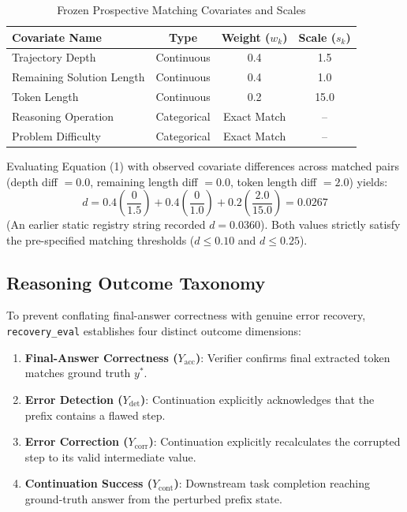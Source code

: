\documentclass[conference]{IEEEtran}
\begin{document}
\begin{table}[htbp]
\caption{Frozen Prospective Matching Covariates and Scales}
\label{tab:covariates}
\centering
\begin{tabularx}{\columnwidth}{Xccc}
\toprule
\textbf{Covariate Name} & \textbf{Type} & \textbf{Weight ($w_k$)} & \textbf{Scale ($s_k$)} \\
\midrule
Trajectory Depth & Continuous & 0.4 & 1.5 \\
Remaining Solution Length & Continuous & 0.4 & 1.0 \\
Token Length & Continuous & 0.2 & 15.0 \\
Reasoning Operation & Categorical & Exact Match & -- \\
Problem Difficulty & Categorical & Exact Match & -- \\
\bottomrule
\end{tabularx}
\end{table}

Evaluating Equation (1) with observed covariate differences across matched pairs (depth diff $= 0.0$, remaining length diff $= 0.0$, token length diff $= 2.0$) yields:
\begin{equation}
d = 0.4\left(\frac{0}{1.5}\right) + 0.4\left(\frac{0}{1.0}\right) + 0.2\left(\frac{2.0}{15.0}\right) = 0.0267
\end{equation}
(An earlier static registry string recorded $d=0.0360$). Both values strictly satisfy the pre-specified matching thresholds ($d \le 0.10$ and $d \le 0.25$).

\subsection{Reasoning Outcome Taxonomy}
To prevent conflating final-answer correctness with genuine error recovery, \texttt{recovery\_eval} establishes four distinct outcome dimensions:
\begin{enumerate}
    \item \textbf{Final-Answer Correctness ($Y_{\text{acc}}$)}: Verifier confirms final extracted token matches ground truth $y^*$.
    \item \textbf{Error Detection ($Y_{\text{det}}$)}: Continuation explicitly acknowledges that the prefix contains a flawed step.
    \item \textbf{Error Correction ($Y_{\text{corr}}$)}: Continuation explicitly recalculates the corrupted step to its valid intermediate value.
    \item \textbf{Continuation Success ($Y_{\text{cont}}$)}: Downstream task completion reaching ground-truth answer from the perturbed prefix state.
\end{enumerate}
\end{document}
